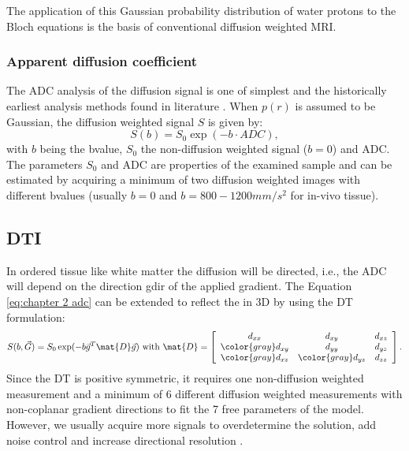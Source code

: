 The application of this Gaussian probability distribution of water protons to the Bloch equations is the basis of conventional diffusion weighted MRI. 


\label{sec:gaussian_diffusion}
\subsubsection*{Apparent diffusion coefficient}
\label{subsec:adc}
The \gls{ADC} analysis of the diffusion signal is one of simplest and the historically earliest analysis methods found in literature \citep{ADC citations}.  When $p(r)$ is assumed to be Gaussian, the diffusion weighted signal $S$ is given by:
\begin{equation}
	S(b) = S_{0}\exp(-b\cdot ADC),
    \label{eq:chapter 2 adc}
\end{equation}
with $b$ being the {\gls{bvalue}}, $S_{0}$ the non-diffusion weighted signal ($b=0$) and \gls{ADC}. The parameters $S_0$ and \gls{ADC} are properties of the examined sample and can be estimated by acquiring a minimum of two diffusion weighted images with different {\glspl{bvalue}} (usually $b=0$ and $b=800-1200mm/s^2$ for in-vivo tissue). 
\subsection*{{\protect\acrlong{DTI}}}
\label{subsec:dti}
In ordered tissue like white matter the diffusion will be directed, i.e., the \gls{ADC} will depend on the direction {\gls{gdir}} of the applied gradient. The Equation \ref{eq:chapter 2 adc} can be extended to reflect the in 3D by using the {\gls{DT}} formulation:
\begin{equation}
	S(b,\vec{G}) = S_{0}\exp(-b\vec{g}^T \mat{D}\vec{g}) \mbox{ with } \mat{D} = 
	\left[
	\begin{array}{ccc}
	d_{xx} & d_{xy} & d_{xz} \\
	{\color{gray} d_{xy}} & d_{yy} & d_{yz} \\
	{\color{gray} d_{xz}} & {\color{gray} d_{yz}} & d_{zz} 	
	\end{array} \right].	
    \label{eq:dti}
\end{equation}
Since the {\gls{DT}} is positive symmetric, it requires one non-diffusion weighted measurement and a minimum of 6 different diffusion weighted measurements with non-coplanar gradient directions to fit the 7 free parameters of the model. However, we usually acquire more signals to overdetermine the solution, add noise control and increase directional resolution \citep{Jones:2004a}.

